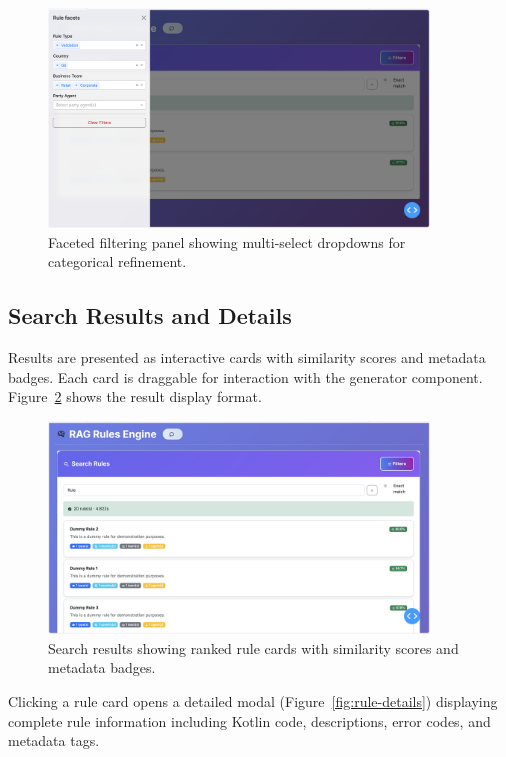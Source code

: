 \begin{figure}[!htbp]
\centering
\includegraphics[width=0.9\textwidth]{Figures/search_filters.png}
\caption{Faceted filtering panel showing multi-select dropdowns for categorical refinement.}
\label{fig:search-filters}
\end{figure}

\subsection{Search Results and Details}

Results are presented as interactive cards with similarity scores and metadata badges. Each card is draggable for interaction with the generator component. Figure~\ref{fig:search-results} shows the result display format.

\begin{figure}[!htbp]
\centering
\includegraphics[width=0.9\textwidth]{Figures/full_search_results.png}
\caption{Search results showing ranked rule cards with similarity scores and metadata badges.}
\label{fig:search-results}
\end{figure}

Clicking a rule card opens a detailed modal (Figure~\ref{fig:rule-details}) displaying complete rule information including Kotlin code, descriptions, error codes, and metadata tags.

